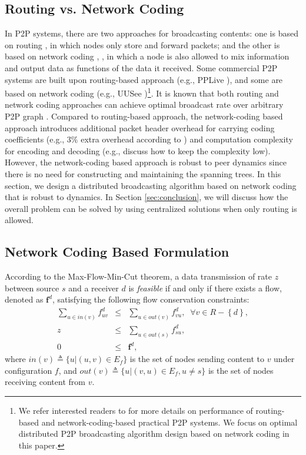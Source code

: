 \documentclass[10pt,conference]{IEEEtran}
\begin{document}
\subsection{Routing vs. Network Coding}\label{subsec:routing-vs-coding}

In P2P systems, there are two approaches for broadcasting contents:
one is based on routing \cite{liu2008opportunities}, in which nodes only store and forward packets;
and the other is based on network coding \cite{all:NetCod:ACLY00}, \cite{liu2008opportunities},
in which a node is also allowed to mix information and output data
as functions of the data it received. Some commercial P2P systems
are built upon routing-based approach (e.g., PPLive \cite{all:pplive}),
and some are based on network coding (e.g., UUSee \cite{all:uusee,liu-uusee})\footnote{We refer interested readers to \cite{liu-uusee,hei2007msl}
for more details on performance of routing-based and network-coding-based
practical P2P systems. We focus on optimal distributed P2P broadcasting
algorithm design based on network coding in this paper. }. It is known that both routing and network coding approaches can
achieve optimal broadcast rate over arbitrary P2P graph \cite{chen2008ump,massoulie2007rdb}.
Compared to routing-based approach, the network-coding based approach introduces additional packet
header overhead for carrying coding coefficients (e.g., $3\%$ extra overhead according to \cite{chou2003practical}) and computation complexity for encoding and decoding (e.g., \cite{wang2007r,liu-uusee} discuss how to keep the complexity low). However, the network-coding based approach is robust to peer dynamics since there is no need
for constructing and maintaining the spanning trees. In this
section, we design a distributed broadcasting algorithm based on network
coding that is robust to dynamics. In Section \ref{sec:conclusion}, we will discuss how the overall problem can be solved by using centralized solutions when only routing is allowed.

\subsection{Network Coding Based Formulation}\label{subsec:nc-formulation}

According to the Max-Flow-Min-Cut theorem, a data transmission of rate
$z$ between source $s$ and a receiver $d$ is \emph{feasible}
if and only if there exists a flow, denoted as $\boldsymbol{f}^{d}$,
satisfying the following flow conservation constraints: \begin{eqnarray}
\sum_{u\in in(v)}f_{uv}^{d} & \leq & \sum_{u\in out(v)}f_{vu}^{d},\;\;\forall v\in R-\left\{ d\right\} ,\label{eq:flow-constraint-2}\\
z & \leq & \sum_{u\in out(s)}f_{su}^{d},\label{eq:eq:flow-constraint-3}\\
0 & \leq & \boldsymbol{f}^{d},\label{eq:flow-constraint-1}\end{eqnarray}
 where $in(v)\triangleq\{u|(u,v)\in E_{f}\}$ is the set of nodes
sending content to $v$ under configuration $f$, and $out(v)\triangleq\{u|(v,u)\in E_{f},u\neq s\}$
is the set of nodes receiving content from  $v$.
\end{document}
